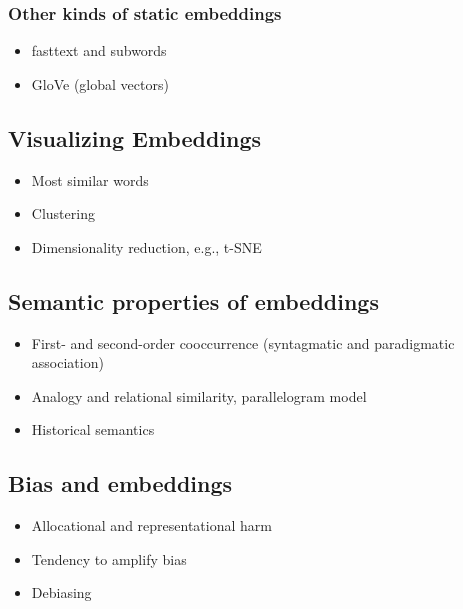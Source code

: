 \subsubsection{Other kinds of static embeddings}

\begin{itemize}
  \item fasttext and subwords
  \item GloVe (global vectors)
\end{itemize}

\subsection{Visualizing Embeddings}

\begin{itemize}
  \item Most similar words
  \item Clustering
  \item Dimensionality reduction, e.g., t-SNE
\end{itemize}

\subsection{Semantic properties of embeddings}

\begin{itemize}
  \item First- and second-order cooccurrence (syntagmatic and paradigmatic association)
  \item Analogy and relational similarity, parallelogram model
  \item Historical semantics
\end{itemize}

\subsection{Bias and embeddings}

\begin{itemize}
  \item Allocational and representational harm
  \item Tendency to amplify bias
  \item Debiasing
\end{itemize}